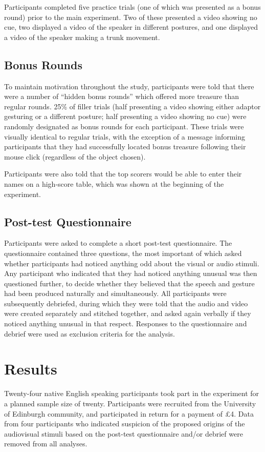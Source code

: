 \documentclass[a4paper,man,natbib]{apa6}
\begin{document}
Participants completed five practice trials (one of which was presented as a bonus round) prior to the main experiment. 
Two of these presented a video showing no cue, two displayed a video of the speaker in different postures, and one displayed a video of the speaker making a trunk movement.

\subsection{Bonus Rounds}
To maintain motivation throughout the study, participants were told that there were a number of ``hidden bonus rounds'' which offered more treasure than regular rounds.
25\% of filler trials (half presenting a video showing either adaptor gesturing or a different posture; half presenting a video showing no cue) were randomly designated as bonus rounds for each participant.
These trials were visually identical to regular trials, with the exception of a message informing participants that they had successfully located bonus treasure following their mouse click (regardless of the object chosen).

Participants were also told that the top scorers would be able to enter their names on a high-score table, which was shown at the beginning of the experiment. 

\subsection{Post-test Questionnaire}
Participants were asked to complete a short post-test questionnaire. 
The questionnaire contained three questions, the most important of which asked whether participants had noticed anything odd about the visual or audio stimuli.
Any participant who indicated that they had noticed anything unusual was then questioned further, to decide whether they believed that the speech and gesture had been produced naturally and simultaneously.
All participants were subsequently debriefed, during which they were told that the audio and video were created separately and stitched together, and asked again verbally if they noticed anything unusual in that respect. 
Responses to the questionnaire and debrief were used as exclusion criteria for the analysis.

\section{Results}
Twenty-four native English speaking participants took part in the experiment for a planned sample size of twenty.
Participants were recruited from the University of Edinburgh community, and participated in return for a payment of \pounds{}4.
Data from four participants who indicated suspicion of the proposed origins of the audiovisual stimuli based on the post-test questionnaire and/or debrief were removed from all analyses.
\end{document}

